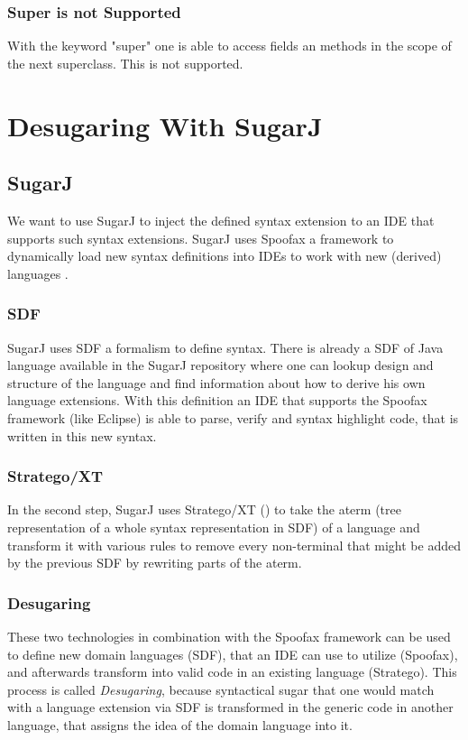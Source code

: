 \documentclass{report}
\begin{document}
\subsection{Super is not Supported}

With the keyword "super" one is able to access fields an methods in the scope of the next superclass. This is not supported.

\chapter{Desugaring With SugarJ}
\label{sugarJChapter}

\section{SugarJ}
We want to use SugarJ \cite{Erdweg-SugarJ-2011} to inject the defined syntax extension to an IDE that supports such syntax extensions. SugarJ uses Spoofax a framework to dynamically load new syntax definitions into IDEs to work with new (derived) languages \cite{Kats-Spoofax-2010}.

\subsection{SDF}
SugarJ uses SDF \cite{Heering-SDF-1989, Brand-SDF-2007} a formalism to define syntax. There is already a SDF of Java language available in the SugarJ repository \cite{Java-SDF-2014} where one can lookup design and structure of the language and find information about how to derive his own language extensions. With this definition an IDE that supports the Spoofax framework (like Eclipse) is able to parse, verify and syntax highlight code, that is written in this new syntax.

\subsection{Stratego/XT}
In the second step, SugarJ uses Stratego/XT (\cite{Stratego-Manual, Kats-Spoofax-2010}) to take the aterm (tree representation of a whole syntax representation in SDF) of a language and transform it with various rules to remove every non-terminal that might be added by the previous SDF by rewriting parts of the aterm.

\subsection{Desugaring}
These two technologies in combination with the Spoofax framework can be used to define new domain languages (SDF), that an IDE can use to utilize (Spoofax), and afterwards transform into valid code in an existing language (Stratego). This process is called \emph{Desugaring}, because syntactical sugar that one would match with a language extension via SDF is transformed in the generic code in another language, that assigns the idea of the domain language into it.
\end{document}
